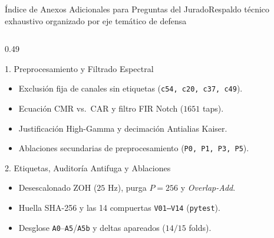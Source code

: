 
\begin{frame}{\'Indice de Anexos Adicionales para Preguntas del Jurado}{Respaldo t\'ecnico exhaustivo organizado por eje tem\'atico de defensa \cite{rodas_valencia_tpe_ecog}}
  \label{anexo:indice_extra}
  \vspace{-1.5mm}
  \begin{columns}[T,onlytextwidth]
    \begin{column}{0.49\textwidth}
      \begin{block}{1. Preprocesamiento y Filtrado Espectral}
        \tiny
        \begin{itemize}\setlength{\itemsep}{-0.5pt}
          \item \hyperlink{anexo:exclusion_canales}{} Exclusi\'on fija de canales sin etiquetas (\texttt{c54, c20, c37, c49}).
          \item \hyperlink{anexo:cmr_notch}{} Ecuaci\'on CMR vs.\ CAR y filtro FIR Notch ($1651$ taps).
          \item \hyperlink{anexo:ersp_antialias}{} Justificaci\'on High-Gamma y decimaci\'on Antialias Kaiser.
          \item \hyperlink{anexo:ablacion_preproc}{} Ablaciones secundarias de preprocesamiento (\texttt{P0, P1, P3, P5}).
        \end{itemize}
      \end{block}
      \vspace{-2.5mm}
      \begin{block}{2. Etiquetas, Auditor\'ia Antifuga y Ablaciones}
        \tiny
        \begin{itemize}\setlength{\itemsep}{-0.5pt}
          \item \hyperlink{anexo:zoh_overlap}{} Desescalonado ZOH ($25\text{ Hz}$), purga $P=256$ y \textit{Overlap-Add}.
          \item \hyperlink{anexo:auditoria_v01_v14}{} Huella SHA-256 y las 14 compuertas \texttt{V01--V14} (\texttt{pytest}).
          \item \hyperlink{anexo:ablaciones_detalle}{} Desglose \texttt{A0}--\texttt{A5}/\texttt{A5b} y deltas apareados ($14/15$ folds).
        \end{itemize}
      \end{block}
    \end{column}


\end{columns}
\end{frame}
